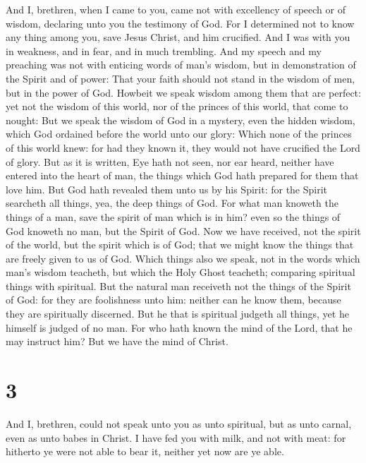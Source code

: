  And I, brethren, when I came to you, came not with
excellency of speech or of wisdom, declaring unto you the testimony of
God.  For I determined not to know any thing among you, save
Jesus Christ, and him crucified.  And I was with you in
weakness, and in fear, and in much trembling.  And my speech
and my preaching was not with enticing words of man's wisdom, but in
demonstration of the Spirit and of power:  That your faith
should not stand in the wisdom of men, but in the power of God.
 Howbeit we speak wisdom among them that are perfect: yet
not the wisdom of this world, nor of the princes of this world, that
come to nought:  But we speak the wisdom of God in a
mystery, even the hidden wisdom, which God ordained before the world
unto our glory:  Which none of the princes of this world
knew: for had they known it, they would not have crucified the Lord of
glory.  But as it is written, Eye hath not seen, nor ear
heard, neither have entered into the heart of man, the things which God
hath prepared for them that love him.  But God hath
revealed them unto us by his Spirit: for the Spirit searcheth all
things, yea, the deep things of God.  For what man knoweth
the things of a man, save the spirit of man which is in him? even so the
things of God knoweth no man, but the Spirit of God.  Now
we have received, not the spirit of the world, but the spirit which is
of God; that we might know the things that are freely given to us of
God.  Which things also we speak, not in the words which
man's wisdom teacheth, but which the Holy Ghost teacheth; comparing
spiritual things with spiritual.  But the natural man
receiveth not the things of the Spirit of God: for they are foolishness
unto him: neither can he know them, because they are spiritually
discerned.  But he that is spiritual judgeth all things,
yet he himself is judged of no man.  For who hath known the
mind of the Lord, that he may instruct him? But we have the mind of
Christ.

\hypertarget{section-2}{%
\section{3}\label{section-2}}

 And I, brethren, could not speak unto you as unto
spiritual, but as unto carnal, even as unto babes in Christ.
 I have fed you with milk, and not with meat: for hitherto
ye were not able to bear it, neither yet now are ye able.

